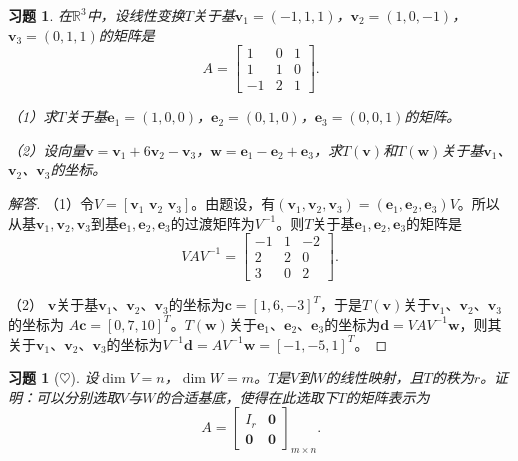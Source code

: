 \documentclass[UTF8]{ctexart}
\newtheorem{ex}[thm]{习题}
\begin{document}
\begin{ex}
	在$\mathbb{R}^3$中，设线性变换$T$关于基$\mathbf{v}_1=(-1,1,1)$，$\mathbf{v}_2=(1,0,-1)$，$\mathbf{v}_3=(0,1,1)$的矩阵是
	$$\,A = \left[\begin{array}{rrr} 
	1 & 0 & 1\\ 
	1 & 1 & 0\\
	-1 & 2 & 1
	\end{array}\right].$$ 	
	
	（1）求$T$关于基$\mathbf{e}_1=(1,0,0)$，$\mathbf{e}_2=(0,1,0)$，$\mathbf{e}_3=(0,0,1)$的矩阵。
	
	（2）设向量$\mathbf{v}=\mathbf{v}_1+6\mathbf{v}_2-\mathbf{v}_3$，$\mathbf{w}=\mathbf{e}_1-\mathbf{e}_2+\mathbf{e}_3$，求$T(\mathbf{v})$和$T(\mathbf{w})$关于基$\mathbf{v}_1$、$\mathbf{v}_2$、$\mathbf{v}_3$的坐标。
\end{ex}
\begin{proof}[解答]
	（1）令$V=[\mathbf{v}_1\,\, \mathbf{v}_2\,\, \mathbf{v}_3]$。由题设，有$(\mathbf{v}_1,\mathbf{v}_2, \mathbf{v}_3)=(\mathbf{e}_1,\mathbf{e}_2, \mathbf{e}_3)V$。所以从基$\mathbf{v}_1,\mathbf{v}_2, \mathbf{v}_3$到基$\mathbf{e}_1,\mathbf{e}_2, \mathbf{e}_3$的过渡矩阵为$V^{-1}$。则$T$关于基$\mathbf{e}_1,\mathbf{e}_2, \mathbf{e}_3$的矩阵是
	$$VAV^{-1}=\left[\begin{array}{rrr} 
	-1 & 1 & -2\\ 
	2 & 2 & 0\\
	3 & 0 & 2
	\end{array}\right].$$	
	
	（2）	$\mathbf{v}$关于基$\mathbf{v}_1$、$\mathbf{v}_2$、$\mathbf{v}_3$的坐标为$\mathbf{c}=[1, 6, -3]^T$，于是$T(\mathbf{v})$关于$\mathbf{v}_1$、$\mathbf{v}_2$、$\mathbf{v}_3$的坐标为
	$A\mathbf{c}=[0,7,10]^T$。$T(\mathbf{w})$关于$\mathbf{e}_1$、$\mathbf{e}_2$、$\mathbf{e}_3$的坐标为$\mathbf{d}=VAV^{-1}\mathbf{w}$，则其关于$\mathbf{v}_1$、$\mathbf{v}_2$、$\mathbf{v}_3$的坐标为$V^{-1}\mathbf{d}=AV^{-1}\mathbf{w}=[-1,-5,1]^T$。
\end{proof}


\begin{ex}[$\heartsuit $]
设$\dim V=n$，$\dim W=m$。$T$是$V$到$W$的线性映射，且$T$的秩为$r$。证明：可以分别选取$V$与$W$的合适基底，使得在此选取下$T$的矩阵表示为
$$\,A = \left[\begin{array}{cc} 
I_r & \mathbf{0}\\ 
\mathbf{0}& \mathbf{0}
\end{array}\right]_{m\times n}.$$ 	
\end{ex}
\end{document}
